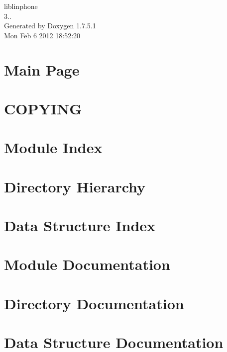\documentclass[a4paper]{book}
\begin{document}
\begin{titlepage}
\vspace*{7cm}
\begin{center}
{\Large liblinphone \\[1ex]\large 3.. }\\
\vspace*{1cm}
{\large \-Generated by Doxygen 1.7.5.1}\\
\vspace*{0.5cm}
{\small Mon Feb 6 2012 18:52:20}\\
\end{center}
\end{titlepage}
\clearemptydoublepage
{}
\tableofcontents
\clearemptydoublepage
{}
\chapter{\-Main \-Page}
\label{index}
\chapter{\-C\-O\-P\-Y\-I\-N\-G}
\label{liblinphone_license}

\chapter{\-Module \-Index}

\chapter{\-Directory \-Hierarchy}

\chapter{\-Data \-Structure \-Index}

\chapter{\-Module \-Documentation}



















\chapter{\-Directory \-Documentation}



\chapter{\-Data \-Structure \-Documentation}


\printindex
\end{document}
